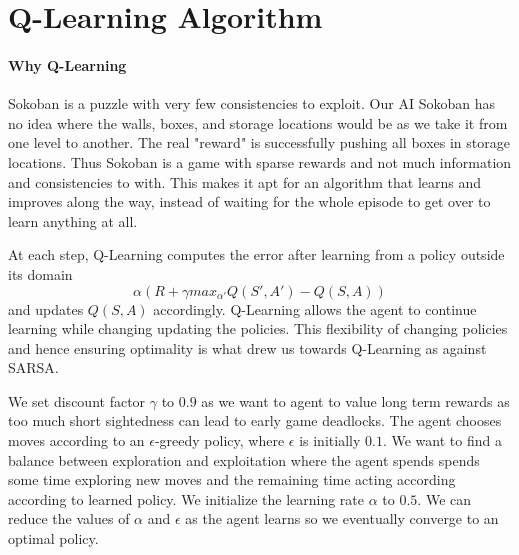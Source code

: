 \documentclass{article}
\begin{document}
\section{Q-Learning Algorithm}

\paragraph{Why Q-Learning}
Sokoban is a puzzle with very few consistencies to exploit. Our AI Sokoban has no idea where the walls, boxes, and storage locations would be as we take it from one level to another. The real "reward" is successfully pushing all boxes in storage locations. Thus Sokoban is a game with sparse rewards and not much information and consistencies to with. This makes it apt for an algorithm that learns and improves along the way, instead of waiting for the whole episode to get over to learn anything at all.

At each step, Q-Learning computes the error after learning from a policy outside its domain $$\alpha(R + \gamma max_{\alpha'}Q(S',A') - Q(S,A))$$ 
and updates $Q(S,A)$ accordingly. Q-Learning allows the agent to continue learning while changing updating the policies. This flexibility of changing policies and hence ensuring optimality is what drew us towards Q-Learning as against SARSA. 

We set discount factor $\gamma$ to $0.9$ as we want to agent to value long term rewards as too much short sightedness can lead to early game deadlocks. The agent chooses moves according to an $\epsilon$-greedy policy, where $\epsilon$ is initially $0.1$. We want to find a balance between exploration and exploitation where the agent spends spends some time exploring new moves and the remaining time acting according according to learned policy. We initialize the learning rate $\alpha$ to $0.5$. We can reduce the values of $\alpha$ and $\epsilon$ as the agent learns so we eventually converge to an optimal policy. 
\end{document}
